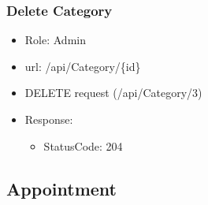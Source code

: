 \documentclass[11pt]{article}
\begin{document}
\subsubsection{Delete Category}
\label{sec:org6366e0a}
\begin{itemize}
\item Role: Admin
\item url: /api/Category/\{id\}
\item DELETE request (/api/Category/3)
\item Response:
\begin{itemize}
\item StatusCode: 204
\end{itemize}
\end{itemize}
\subsection{Appointment}
\label{sec:org83b891d}
\end{document}
